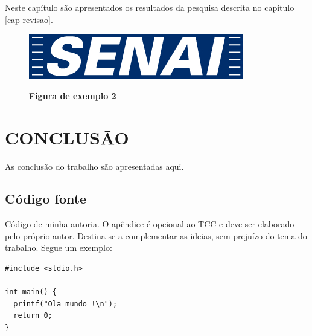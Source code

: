 \documentclass[
	12pt,				%
	openright,			%
	oneside,			%
	a4paper,			%
	chapter=TITLE,		%
	section=TITLE,		%
	brazil				%
	]{abntex2}
\begin{document}
Neste capítulo são apresentados os resultados da pesquisa descrita no capítulo \ref{cap-revisao}.

\begin{figure}[htb]
  \begin{center}
    \caption{\textbf{Figura de exemplo 2}}\label{fig-exemplo1}
    \includegraphics [scale=0.6]{logo-senai.jpg}
    \label{fig-exemplo1}
  \end{center}
\end{figure}
\chapter{CONCLUSÃO}

As conclusão do trabalho são apresentadas aqui.





%
%


\begin{apendicesenv}

\chapter{Código fonte}
Código de minha autoria. O apêndice é opcional ao TCC e deve ser elaborado pelo próprio autor. Destina-se a complementar as ideias, sem prejuízo do tema do trabalho. Segue um exemplo:

\scriptsize
\begin{lstlisting}
#include <stdio.h>

int main() {
  printf("Ola mundo !\n");
  return 0;
}
\end{lstlisting}

\end{apendicesenv}
\end{document}
